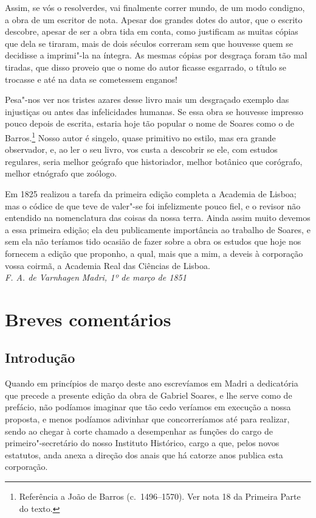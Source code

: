 Assim, se vós o resolverdes, vai finalmente correr mundo, de um 
modo condigno, a obra de um escritor de nota. Apesar dos
grandes dotes do autor, que o escrito descobre, apesar de ser a obra tida 
em conta, como justificam as muitas cópias que dela se tiraram, mais de 
dois séculos correram sem que houvesse quem se decidisse a imprimi"-la 
na íntegra. As mesmas cópias por desgraça foram tão mal tiradas, que 
disso proveio que o nome do autor ficasse esgarrado, o título se trocasse 
e até na data se cometessem enganos!

Pesa"-nos ver nos tristes azares desse livro mais um desgraçado 
exemplo das injustiças ou antes das infelicidades humanas. Se essa obra 
se houvesse impresso pouco depois de escrita, estaria hoje tão popular o 
nome de Soares como o de Barros.\footnote{ Referência a João de Barros (c.~1496--1570). 
Ver nota 18 da Primeira Parte do texto.} Nosso autor é singelo, quase 
primitivo no estilo, mas era grande observador, e, ao ler o seu livro, vos 
custa a descobrir se ele, com estudos regulares, seria melhor geógrafo 
que historiador, melhor botânico que corógrafo, melhor etnógrafo que zoólogo.

Em 1825 realizou a tarefa da primeira edição completa a Academia 
de Lisboa; mas o códice de que teve de valer"-se foi infelizmente pouco 
fiel, e o revisor não entendido na nomenclatura das coisas da nossa terra. 
Ainda assim muito devemos a essa primeira edição; ela deu 
publicamente importância ao trabalho de Soares, e sem ela não teríamos 
tido ocasião de fazer sobre a obra os estudos que hoje nos fornecem a 
edição que proponho, a qual, mais que a mim, a deveis à corporação 
vossa coirmã, a Academia Real das Ciências de Lisboa.\\

\noindent\textit{F. A. de Varnhagen}  \textit{Madri, 1º de março de 1851}\\

\endgroup

\chapter[Breves comentários]{Breves comentários }

\section{Introdução}
\noindent Quando em princípios de março deste ano escrevíamos em Madri a 
dedicatória que precede a presente edição da obra de Gabriel Soares, e 
lhe serve como de prefácio, não podíamos imaginar que tão cedo 
veríamos em execução a nossa proposta, e menos podíamos adivinhar 
que concorreríamos até para realizar, sendo ao chegar à corte chamado a 
desempenhar as funções do cargo de primeiro"-secretário do nosso 
Instituto Histórico, cargo a que, pelos novos estatutos, anda anexa a 
direção dos anais que há catorze anos publica esta corporação.

